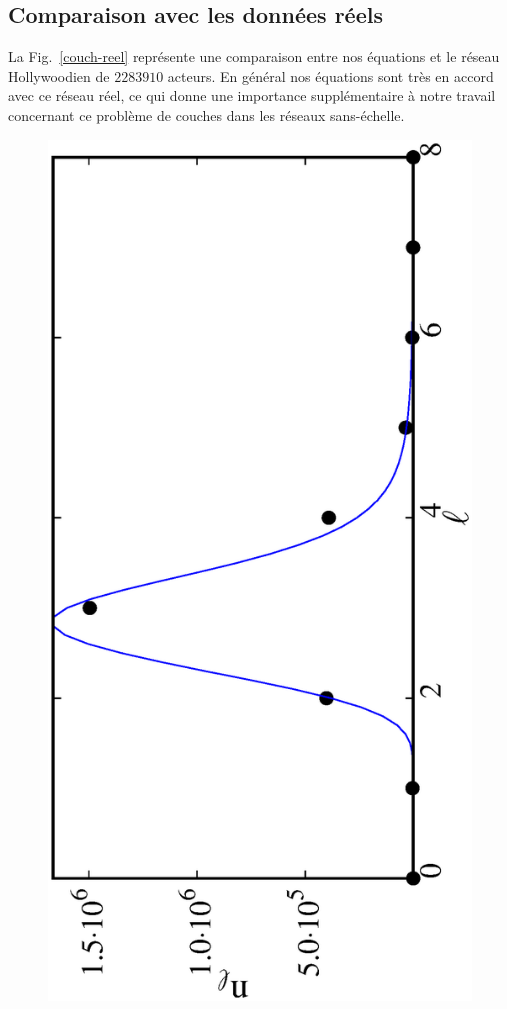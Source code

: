 \subsection{Comparaison avec les données réels}
La Fig.~\ref{couch-reel} représente une comparaison entre nos équations et le réseau Hollywoodien de $2283910$ acteurs. En général nos équations sont très en accord avec ce réseau réel, ce qui donne une importance supplémentaire à notre travail concernant ce problème de couches dans les réseaux sans-échelle. 
\begin{figure}[h!]
	\centering
	\includegraphics[scale=0.4,angle=-90]{./figures/couch-reel2}

\end{figure}
